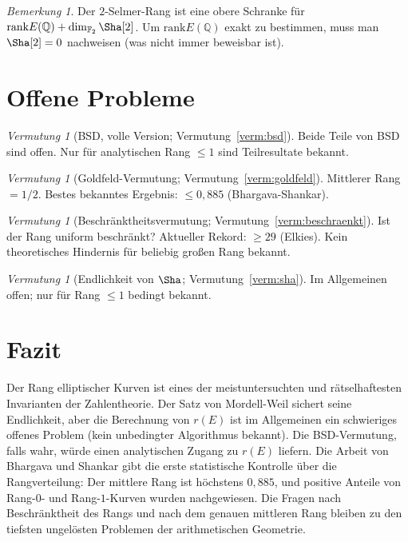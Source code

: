 \documentclass[12pt,a4paper]{amsart}
\theoremstyle{definition}
\theoremstyle{remark}
\newtheorem{bemerkung}[theorem]{Bemerkung}
\newtheorem{vermutung}[theorem]{Vermutung}
\newcommand{\Q}{\mathbb{Q}}
\newcommand{\F}{\mathbb{F}}
\newcommand{\rank}{\mathrm{rank}}
\begin{document}
\begin{bemerkung}
  Der $2$-Selmer-Rang ist eine obere Schranke für $\rank E(\Q) + \dim_{\F_2} \Sha[2]$.
  Um $\rank E(\Q)$ exakt zu bestimmen, muss man $\Sha[2] = 0$ nachweisen
  (was nicht immer beweisbar ist).
\end{bemerkung}

\section{Offene Probleme}\label{sec:offene_probleme}

\begin{vermutung}[BSD, volle Version; Vermutung~\ref{verm:bsd}]
  Beide Teile von BSD sind offen.
  Nur für analytischen Rang $\leq 1$ sind Teilresultate bekannt.
\end{vermutung}

\begin{vermutung}[Goldfeld-Vermutung; Vermutung~\ref{verm:goldfeld}]
  Mittlerer Rang $= 1/2$.
  Bestes bekanntes Ergebnis: $\leq 0{,}885$ (Bhargava-Shankar).
\end{vermutung}

\begin{vermutung}[Beschränktheitsvermutung; Vermutung~\ref{verm:beschraenkt}]
  Ist der Rang uniform beschränkt?
  Aktueller Rekord: $\geq 29$ (Elkies).
  Kein theoretisches Hindernis für beliebig großen Rang bekannt.
\end{vermutung}

\begin{vermutung}[Endlichkeit von $\Sha$; Vermutung~\ref{verm:sha}]
  Im Allgemeinen offen; nur für Rang $\leq 1$ bedingt bekannt.
\end{vermutung}

\section{Fazit}\label{sec:fazit}

Der Rang elliptischer Kurven ist eines der meistuntersuchten und rätselhaftesten
Invarianten der Zahlentheorie. Der Satz von Mordell-Weil sichert seine Endlichkeit,
aber die Berechnung von $r(E)$ ist im Allgemeinen ein schwieriges offenes Problem
(kein unbedingter Algorithmus bekannt). Die BSD-Vermutung, falls wahr, würde einen
analytischen Zugang zu $r(E)$ liefern. Die Arbeit von Bhargava und Shankar gibt die
erste statistische Kontrolle über die Rangverteilung: Der mittlere Rang ist höchstens
$0{,}885$, und positive Anteile von Rang-$0$- und Rang-$1$-Kurven wurden nachgewiesen.
Die Fragen nach Beschränktheit des Rangs und nach dem genauen mittleren Rang
bleiben zu den tiefsten ungelösten Problemen der arithmetischen Geometrie.
\end{document}

